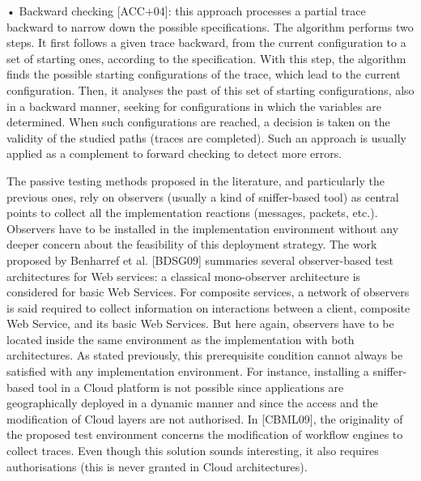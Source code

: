 • Backward checking [ACC+04]: this approach processes a partial
trace backward to narrow down the possible specifications. The
algorithm performs two steps. It first follows a given trace
backward, from the current configuration to a set of starting
ones, according to the specification. With this step, the
algorithm finds the possible starting configurations of the
trace, which lead to the current configuration. Then, it analyses
the past of this set of starting configurations, also in a
backward manner, seeking for configurations in which the
variables are determined. When such configurations are reached, a
decision is taken on the validity of the studied paths (traces
are completed). Such an approach is usually applied as a
complement to forward checking to detect more errors.

The passive testing methods proposed in the literature, and
particularly the previous ones, rely on observers (usually a kind
of sniffer-based tool) as central points to collect all the
implementation reactions (messages, packets, etc.). Observers
have to be installed in the implementation environment without
any deeper concern about the feasibility of this deployment
strategy. The work proposed by Benharref et al. [BDSG09]
summaries several observer-based test architectures for Web
services: a classical mono-observer architecture is considered
for basic Web Services. For composite services, a network of
observers is said required to collect information on interactions
between a client, composite Web Service, and its basic Web
Services. But here again, observers have to be located inside the
same environment as the implementation with both architectures.
As stated previously, this prerequisite condition cannot always
be satisfied with any implementation environment. For instance,
installing a sniffer-based tool in a Cloud platform is not
possible since applications are geographically deployed in a
dynamic manner and since the access and the modification of Cloud
layers are not authorised. In [CBML09], the originality of the
proposed test environment concerns the modification of workflow
engines to collect traces. Even though this solution sounds
interesting, it also requires authorisations (this is never
granted in Cloud architectures).

